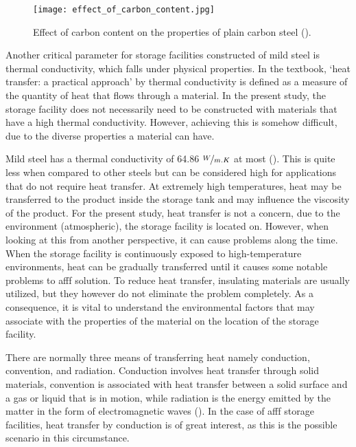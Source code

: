 \begin{figure}[H]
    \centering
    \texttt{[image: effect\_of\_carbon\_content.jpg]}
    \caption{Effect of carbon content on the properties of plain carbon steel (\cite{timings2008fabrication}).}
    \label{ch3:figure:carbon}
\end{figure}

Another critical parameter for storage facilities constructed of mild steel is thermal conductivity, which falls under physical properties. In the textbook, ‘heat transfer: a practical approach’ by \cite{cengel1998heat} thermal conductivity is defined as a measure of the quantity of heat that flows through a material. In the present study, the storage facility does not necessarily need to be constructed with materials that have a high thermal conductivity. However, achieving this is somehow difficult, due to the diverse properties a material can have.

Mild steel has a thermal conductivity of 64.86 $\nicefrac{W}{m.K}$ at most (\cite{cengel1998heat}). This is quite less when compared to other steels but can be considered high for applications that do not require heat transfer. At extremely high temperatures, heat may be transferred to the product inside the storage tank and may influence the viscosity of the product. For the present study, heat transfer is not a concern, due to the environment (atmospheric), the storage facility is located on. However, when looking at this from another perspective, it can cause problems along the time. When the storage facility is continuously exposed to high-temperature environments, heat can be gradually transferred until it causes some notable problems to \acrshort{afff} solution. To reduce heat transfer, insulating materials are usually utilized, but they however do not eliminate the problem completely. As a consequence, it is vital to understand the environmental factors that may associate with the properties of the material on the location of the storage facility.

There are normally three means of transferring heat namely conduction, convention, and radiation. Conduction involves heat transfer through solid materials, convention is associated with heat transfer between a solid surface and a gas or liquid that is in motion, while radiation is the energy emitted by the matter in the form of electromagnetic waves (\cite{cengel1998heat}). In the case of \acrshort{afff} storage facilities, heat transfer by conduction is of great interest, as this is the possible scenario in this circumstance.   

